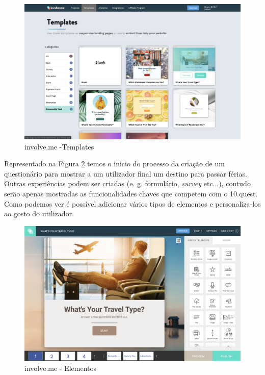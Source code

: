 \begin{figure}[ht!]
	\begin{center}
		\includegraphics[width=1\textwidth]{img/ivme/templates}
		\caption{involve.me -Templates}
		\label{fig:ivme-templares}
	\end{center}
\end{figure}


Representado na Figura \ref{fig:ivme-elements} temos o inicio do processo da criação de um questionário para mostrar a um utilizador final um destino para passar férias. Outras experiências podem ser criadas (e. g. formulário, \textit{survey} etc...), contudo serão apenas mostradas as funcionalidades chaves que competem com o 10.quest. Como podemos ver é possível adicionar vários tipos de elementos e personaliza-los ao gosto do utilizador. 


\begin{figure}[ht!]
	\begin{center}
		\includegraphics[width=1\textwidth]{img/ivme/elements}
		\caption{involve.me - Elementos}
		\label{fig:ivme-elements}
	\end{center}
\end{figure}

